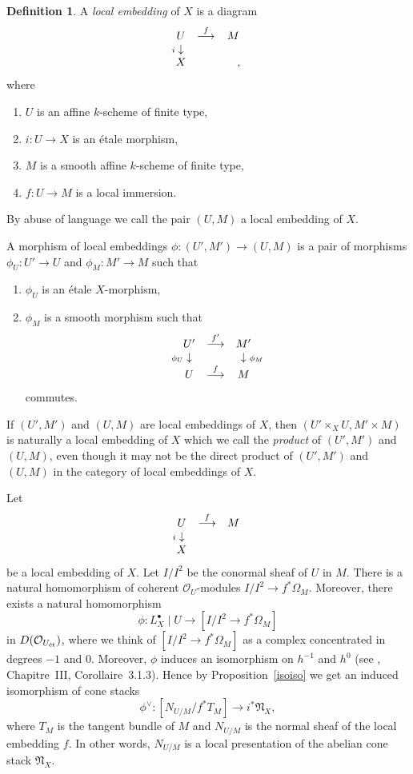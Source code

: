 \documentclass[11pt]{article}
\theoremstyle{plain}
\theoremstyle{definition}
\newtheorem{defnp}[prop]{Definition}
\newenvironment{defn}{\begin{defnp}\normalfont}{\end{defnp}}
\newcommand{\dual}[1]{{{#1}^{\vee}}}
\newcommand{\et}{{\mbox{\tiny \'{e}t}}}
\newcommand{\upst}{^{\ast}}
\newcommand{\com}{^{\scriptscriptstyle\bullet}}
\newcommand{\NN}{{\mathfrak{N}}}
\renewcommand{\O}{{\mathcal{O}}}
\newcommand{\resto}{{ \mid }}
\newcommand{\ldiag}[1]
       {\makebox[0cm]{\({\scriptstyle#1}\downarrow\phantom{\scriptstyle#1}\)}}
\newcommand{\rdiag}[1]
       {\makebox[0cm]{\(\phantom{\scriptstyle#1}\downarrow{\scriptstyle#1}\)}}
\newcommand{\comdia}[9]{
\begin{array}{ccc}
#1 & \stackrel{#2}{\longrightarrow} & #3 \\
\ldiag{#4} & #5 & \rdiag{#6} \\
#7 & \stackrel{#8}{\longrightarrow} & #9
\end{array}}
\theoremstyle{plain}
\theoremstyle{definition}
\theoremstyle{remark}
\begin{document}
\begin{defn}  A {\em local embedding }of \(X\) is a diagram
\[
\begin{array}{ccc} U & \stackrel{f}{\longrightarrow} & M \\
\ldiag{i} & & \\ X & &\quad,
\end{array}
\]
where
\begin{enumerate}
\item \(U\) is an affine \(k\)-scheme of finite type,
\item \(i:U\rightarrow X\) is an \'etale morphism,
\item \(M\) is a smooth affine \(k\)-scheme of finite type,
\item \(f:U\rightarrow M\) is a local immersion.
\end{enumerate} By abuse of language we call the pair \((U,M)\) a local embedding
of \(X\).

A morphism of local embeddings \(\phi:(U',M')\rightarrow(U,M)\) is a pair of
morphisms
\(\phi_U:U'\rightarrow U\) and \(\phi_M:M'\rightarrow M\) such that
\begin{enumerate}
\item \(\phi_U\) is an \'etale \(X\)-morphism,
\item \(\phi_M\) is a smooth morphism such that
\[
\comdia{U'}{f'}{M'}{\phi_U}{}{\phi_M}{U}{f}{M}
\]
commutes.
\end{enumerate}
\end{defn}

If \((U',M')\) and \((U,M)\) are local embeddings of \(X\), then
\((U'\times_X U,M'\times M)\) is naturally a local embedding of \(X\)
which we call the {\em product }of \((U',M')\) and \((U,M)\), even though
it may not be the direct product of \((U',M')\) and \((U,M)\) in the
category of local embeddings of \(X\).

Let
\[
\begin{array}{ccc} U & \stackrel{f}{\longrightarrow} & M \\
\ldiag{i} & & \\ X & &\quad
\end{array}
\]
be a local embedding of \(X\). Let \(I/I^2\) be the conormal sheaf of \(U\)
in \(M\). There is a natural homomorphism of coherent \(\O_U\)-modules
\(I/I^2\rightarrow f\upst\Omega_M\). Moreover, there exists a natural
homomorphism
\[
\phi:L_X\com\resto U\longrightarrow[I/I^2\rightarrow f\upst\Omega_M]
\]
in
\(D(\O_{U_\et})\), where we think of \([I/I^2\rightarrow f\upst\Omega_M]\)
as a complex concentrated in degrees \(-1\) and \(0\).  Moreover, \(\phi\)
induces an isomorphism on \(h^{-1}\) and \(h^0\) (see \cite{Ill},
Chapitre~III, Corollaire~3.1.3). Hence by Proposition~\ref{isoiso} we
get an induced isomorphism of cone stacks
\[
\dual{\phi}:[N_{U/M}/f\upst T_M]\longrightarrow i\upst \NN_X,
\]
where \(T_M\) is the tangent bundle of \(M\) and \(N_{U/M}\) is the normal
sheaf of the local embedding \(f\). In other words, \(N_{U/M}\) is a local
presentation of the abelian cone stack \(\NN_X\).
\end{document}
